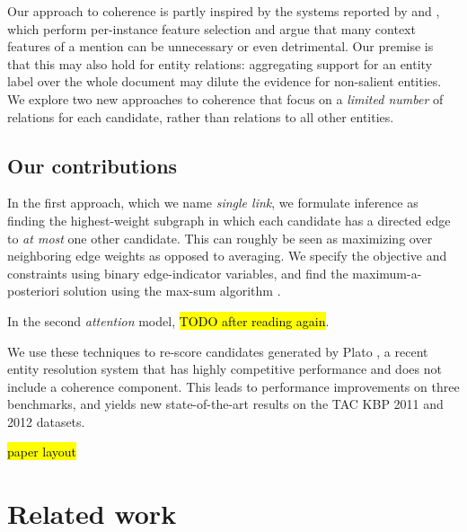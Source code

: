 Our approach to coherence is partly inspired by the systems reported by \cite{Jin:2014} and \cite{Lazic2015}, which perform per-instance feature selection and argue that many context features of a mention can be unnecessary or even detrimental. 
Our premise is that this may also hold for entity relations: aggregating support for an entity label over the whole document may dilute the evidence for non-salient entities. We explore two new approaches to coherence that focus on a \emph{limited number} of relations for each candidate, rather than relations to all other entities. 


\subsection{Our contributions}
\label{sec:intro:our}


In the first approach, which we name \emph{single link}, we formulate inference as finding the highest-weight subgraph in which each candidate has a directed edge to \emph{at most} one other candidate. This can roughly be seen as maximizing over neighboring edge weights as opposed to averaging. %
We specify the objective and constraints using binary edge-indicator variables, and find the maximum-a-posteriori solution using the max-sum algorithm \cite{Kschischang2001}. 

In the second \emph{attention} model, \hl{TODO after reading again}.  %

We use these techniques to re-score candidates generated by Plato \cite{Lazic2015}, a recent entity resolution system that has highly competitive performance and does not include a coherence component. This leads to performance improvements on three benchmarks, and yields new state-of-the-art results on the TAC KBP 2011 and 2012 datasets.

\hl{paper layout}


\section{Related work}
\label{sec:related}

